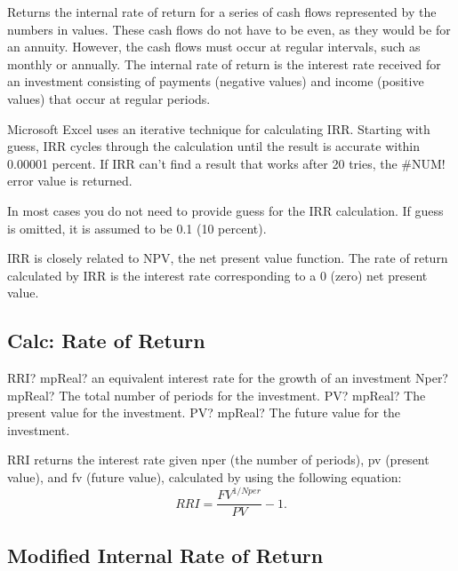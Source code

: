 \vspace{0.3cm}
Returns the internal rate of return for a series of cash flows represented by the numbers in values. These cash flows do not have to be even, as they would be for an annuity. However, the cash flows must occur at regular intervals, such as monthly or annually. The internal rate of return is the interest rate received for an investment consisting of payments (negative values) and income (positive values) that occur at regular periods.

Microsoft Excel uses an iterative technique for calculating IRR. Starting with guess, IRR cycles through the calculation until the result is accurate within 0.00001 percent. If IRR can't find a result that works after 20 tries, the \#NUM! error value is returned.

In most cases you do not need to provide guess for the IRR calculation. If guess is omitted, it is assumed to be 0.1 (10 percent).


IRR is closely related to NPV, the net present value function. The rate of return calculated by IRR is the interest rate corresponding to a 0 (zero) net present value.


\subsection{Calc: Rate of Return}

\begin{mpFunctionsExtract}
	\mpWorksheetFunctionThreeNotImplemented
	{RRI? mpReal? an equivalent interest rate for the growth of an investment}
	{Nper? mpReal? The total number of periods for the investment.}
	{PV? mpReal? The present value for the investment.}
	{PV? mpReal? The future value for the investment.}
\end{mpFunctionsExtract}


\vspace{0.3cm}
RRI returns the interest rate given nper (the number of periods), pv (present value), and fv (future value), calculated by using the following equation:
\begin{equation}
RRI = \frac{FV^{1/Nper}}{PV}-1.
\end{equation}




\subsection{Modified Internal Rate of Return}



